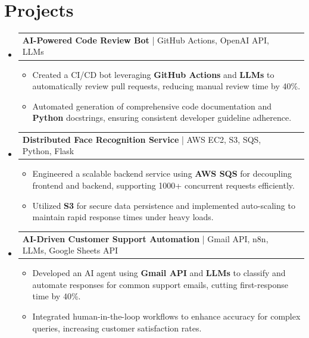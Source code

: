 \documentclass[letterpaper,11pt]{article}
\makeatletter
\newcommand{\resumeItem}[1]{
  \item\footnotesize{
    {#1 \vspace{-2pt}}
  }
}
\newcommand{\resumeProjectHeading}[2]{
    \item
    \begin{tabular*}{1.001\textwidth}{l@{\extracolsep{\fill}}r}
      \small#1 & \textbf{\small #2}\\
    \end{tabular*}\vspace{-7pt}
}
\newcommand{\resumeSubHeadingListStart}{\begin{itemize}[leftmargin=0pt, label={}]}
\newcommand{\resumeSubHeadingListEnd}{\end{itemize}}
\newcommand{\resumeItemListStart}{\begin{itemize}[leftmargin=*]}
\newcommand{\resumeItemListEnd}{\end{itemize}\vspace{-5pt}}
\makeatother
\begin{document}
\section{Projects}
    \vspace{-5pt}
    \resumeSubHeadingListStart
      \resumeProjectHeading
          {\textbf{AI-Powered Code Review Bot} | GitHub Actions, OpenAI API, LLMs}{}
          \resumeItemListStart
              \resumeItem{Created a CI/CD bot leveraging \textbf{GitHub Actions} and \textbf{LLMs} to automatically review pull requests, reducing manual review time by 40\%.}
              \resumeItem{Automated generation of comprehensive code documentation and \textbf{Python} docstrings, ensuring consistent developer guideline adherence.}
          \resumeItemListEnd
          \vspace{-12pt}
      \resumeProjectHeading
          {\textbf{Distributed Face Recognition Service} | AWS EC2, S3, SQS, Python, Flask}{}
          \resumeItemListStart
              \resumeItem{Engineered a scalable backend service using \textbf{AWS SQS} for decoupling frontend and backend, supporting 1000+ concurrent requests efficiently.}
              \resumeItem{Utilized \textbf{S3} for secure data persistence and implemented auto-scaling to maintain rapid response times under heavy loads.}
          \resumeItemListEnd
          \vspace{-12pt}
      \resumeProjectHeading
          {\textbf{AI-Driven Customer Support Automation} | Gmail API, n8n, LLMs, Google Sheets API}{}
          \resumeItemListStart
              \resumeItem{Developed an AI agent using \textbf{Gmail API} and \textbf{LLMs} to classify and automate responses for common support emails, cutting first-response time by 40\%.}
              \resumeItem{Integrated human-in-the-loop workflows to enhance accuracy for complex queries, increasing customer satisfaction rates.}
          \resumeItemListEnd
    \resumeSubHeadingListEnd
\end{document}
